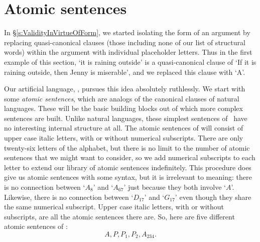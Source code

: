 \section{Atomic sentences}
In §\ref{s:ValidityInVirtueOfForm}, we started isolating the form of an argument by replacing quasi-canonical clauses (those including none of our list of structural words) within the argument with individual placeholder letters. Thus in the first example of this section, `it is raining outside' is a quasi-canonical clause of `If it is raining outside, then Jenny is miserable', and we replaced this clause with `A'. 

Our artificial language, \TFL, pursues this idea absolutely ruthlessly. We start with some \emph{atomic sentences}, which are analogs of the canonical clauses of natural languages.  These will be the basic building blocks out of which more complex sentences are built. Unlike natural languages, these simplest sentences of \TFL\ have no interesting internal structure at all. The atomic sentences of \TFL will consist of upper case italic letters, with or without numerical subscripts. There are only twenty-six letters of the alphabet, but there is no limit to the number of atomic sentences that we might want to consider, so we add numerical subscripts to each letter to extend our library of atomic sentences indefinitely. This procedure does give us atomic sentences with some syntax, but it is irrelevant to meaning: there is no connection between `$A_{8}$' and `$A_{67}$' just because they both involve `$A$'. Likewise, there is no connection between `$D_{17}$' and `$G_{17}$' even though they share the same numerical subscript. Upper case italic letters, with or without subscripts, are all the atomic sentences there are. So, here are five different atomic sentences of \TFL:
	$$A, P, P_{1}, P_{2}, A_{234}.$$ 

